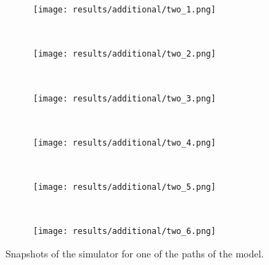 \begin{figure}[H]
\centering
\begin{subfigure}{0.75\textwidth}
  \centering
  \texttt{[image: results/additional/two\_1.png]}
\end{subfigure}\\ \vspace{2px}
\begin{subfigure}{0.75\textwidth}
  \centering
  \texttt{[image: results/additional/two\_2.png]}
\end{subfigure} \\ \vspace{2px}
\begin{subfigure}{0.75\textwidth}
  \centering
  \texttt{[image: results/additional/two\_3.png]}
\end{subfigure} \\ \vspace{2px}
\begin{subfigure}{0.75\textwidth}
  \centering
  \texttt{[image: results/additional/two\_4.png]}
\end{subfigure} \\ \vspace{2px}
\begin{subfigure}{0.75\textwidth}
  \centering
  \texttt{[image: results/additional/two\_5.png]}
\end{subfigure} \\ \vspace{2px}
\begin{subfigure}{0.75\textwidth}
  \centering
  \texttt{[image: results/additional/two\_6.png]}
\end{subfigure}
\caption{Snapshots of the simulator for one of the paths of the model.}
\label{fig:three_vehicle_sim}
\end{figure}





